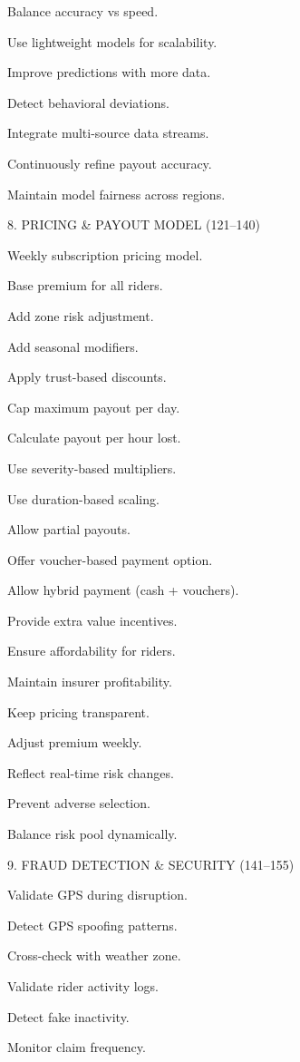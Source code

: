 Balance accuracy vs speed. 

Use lightweight models for scalability. 

Improve predictions with more data. 

Detect behavioral deviations. 

Integrate multi-source data streams. 

Continuously refine payout accuracy. 

Maintain model fairness across regions. 

 

8. PRICING & PAYOUT MODEL (121–140) 

Weekly subscription pricing model. 

Base premium for all riders. 

Add zone risk adjustment. 

Add seasonal modifiers. 

Apply trust-based discounts. 

Cap maximum payout per day. 

Calculate payout per hour lost. 

Use severity-based multipliers. 

Use duration-based scaling. 

Allow partial payouts. 

Offer voucher-based payment option. 

Allow hybrid payment (cash + vouchers). 

Provide extra value incentives. 

Ensure affordability for riders. 

Maintain insurer profitability. 

Keep pricing transparent. 

Adjust premium weekly. 

Reflect real-time risk changes. 

Prevent adverse selection. 

Balance risk pool dynamically. 

 

 9. FRAUD DETECTION & SECURITY (141–155) 

Validate GPS during disruption. 

Detect GPS spoofing patterns. 

Cross-check with weather zone. 

Validate rider activity logs. 

Detect fake inactivity. 

Monitor claim frequency. 

